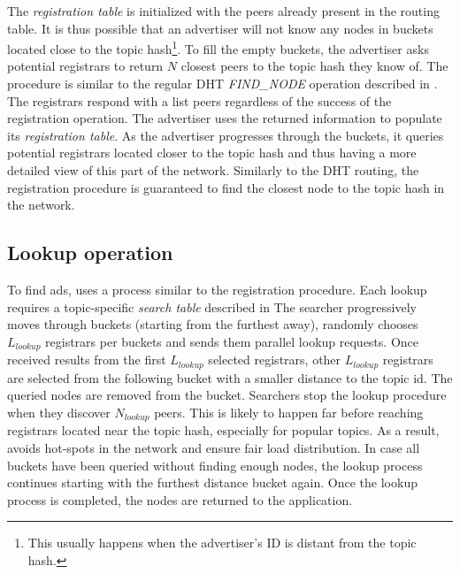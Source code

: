 The \emph{registration table} is initialized with the peers already present in the routing table. It is thus possible that an advertiser will not know any nodes in buckets located close to the topic hash\footnote{This usually happens when the advertiser's ID is distant from the topic hash.}. 
To fill the empty buckets, the advertiser asks potential registrars to return $N$ closest peers to the topic hash they know of. 
The procedure is similar to the regular DHT \emph{FIND\_NODE} operation described in . 
The registrars respond with a list peers regardless of the success of the registration operation. 
The advertiser uses the returned information to populate its \emph{registration table}. 
As the advertiser progresses through the buckets, it queries potential registrars located closer to the topic hash and thus having a more detailed view of this part of the network. 
Similarly to the DHT routing, the registration procedure is guaranteed to find the closest node to the topic hash in the network. 


\subsection{Lookup operation}\label{sec:lookup}
To find ads, \sysname uses a process similar to the registration procedure. 
Each lookup requires a topic-specific \emph{search table} described in 
The searcher progressively moves through buckets (starting from the furthest away), randomly chooses $L_\textit{lookup}$ registrars per buckets and sends them parallel lookup requests. 
Once received results from the first $L_\textit{lookup}$ selected registrars,  other $L_\textit{lookup}$ registrars are selected from the  following bucket with a smaller distance to the topic id.
The queried nodes are removed from the bucket.
Searchers stop the lookup procedure when they discover $N_\textit{lookup}$ peers. This is likely to happen far before reaching registrars located near the topic hash, especially for popular topics. As a result, \sysname avoids hot-spots in the network and ensure fair load distribution. 
In case all buckets have been queried without finding enough nodes, the lookup process continues starting with the furthest distance bucket again. 
Once the lookup process is completed, the nodes are returned to the application.


